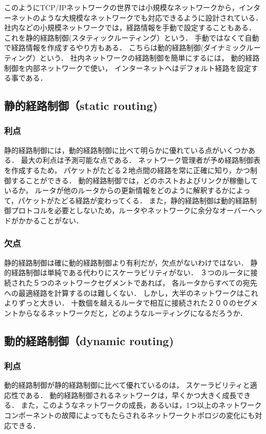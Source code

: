 \documentclass[10pt,a4paper]{jarticle}
\begin{document}
このようにTCP/IPネットワークの世界では小規模なネットワークから，インターネットのような大規模なネットワークでも対応できるように設計されている．
社内などの小規模ネットワークでは，経路情報を手動で設定することもある．
これを静的経路制御(スタティックルーティング）という．
手動ではなくて自動で経路情報を作成するやり方もある．
こちらは動的経路制御(ダイナミックルーティング）という．
社内ネットワークの経路制御を簡単にするには，
動的経路制御を内部ネットワークで使い，
インターネットへはデフォルト経路を設定する事である．

\subsection{静的経路制御（static routing)} 
\vspace{-6mm}
\subsubsection{利点}
静的経路制御には，動的経路制御に比べて明らかに優れている点がいくつかある．
最大の利点は予測可能な点である．
ネットワーク管理者が予め経路制御表を作成するため，
パケットがたどる２地点間の経路を常に正確に知り，かつ制御することができる．
動的経路制御では，どのホストおよびリンクが稼働しているか，
ルータが他のルータからの更新情報をどのように解釈するかによって，パケットがたどる経路が変わってくる．
また，静的経路制御は動的経路制御プロトコルを必要としないため，ルータやネットワークに余分なオーバーヘッドがかかることがない．
 
\vspace{-6mm}
\subsubsection{欠点}
静的経路制御は確に動的経路制御より有利だが，欠点がないわけではない．
静的経路制御は単純である代わりにスケーラビリティがない．
３つのルータに接続された５つのネットワークセグメントであれば，
各ルータからすべての宛先への最適経路を計算するのは難しくない．
しかし，大半のネットワークはこれよりずっと大きい．
十数個を越えるルータで相互に接続された２００のセグメントからなるネットワークだと，どのようなルーティングになるだろうか．

\subsection{動的経路制御（dynamic routing)}
\vspace{-6mm}
\subsubsection{利点}
動的経路制御が静的経路制御に比べて優れているのは，
スケーラビリティと適応性である．
動的経路制御されるネットワークは，早くかつ大きく成長できる．
また，このようなネットワークの成長，あるいは，1つ以上のネットワークコンポーネントの故障によってもたらされるネットワークトポロジの変化にも対応できる．
\end{document}
